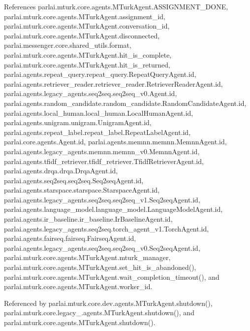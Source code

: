 References parlai.\+mturk.\+core.\+agents.\+M\+Turk\+Agent.\+A\+S\+S\+I\+G\+N\+M\+E\+N\+T\+\_\+\+D\+O\+NE, parlai.\+mturk.\+core.\+agents.\+M\+Turk\+Agent.\+assignment\+\_\+id, parlai.\+mturk.\+core.\+agents.\+M\+Turk\+Agent.\+conversation\+\_\+id, parlai.\+mturk.\+core.\+agents.\+M\+Turk\+Agent.\+disconnected, parlai.\+messenger.\+core.\+shared\+\_\+utils.\+format, parlai.\+mturk.\+core.\+agents.\+M\+Turk\+Agent.\+hit\+\_\+is\+\_\+complete, parlai.\+mturk.\+core.\+agents.\+M\+Turk\+Agent.\+hit\+\_\+is\+\_\+returned, parlai.\+agents.\+repeat\+\_\+query.\+repeat\+\_\+query.\+Repeat\+Query\+Agent.\+id, parlai.\+agents.\+retriever\+\_\+reader.\+retriever\+\_\+reader.\+Retriever\+Reader\+Agent.\+id, parlai.\+agents.\+legacy\+\_\+agents.\+seq2seq.\+seq2seq\+\_\+v0.\+Agent.\+id, parlai.\+agents.\+random\+\_\+candidate.\+random\+\_\+candidate.\+Random\+Candidate\+Agent.\+id, parlai.\+agents.\+local\+\_\+human.\+local\+\_\+human.\+Local\+Human\+Agent.\+id, parlai.\+agents.\+unigram.\+unigram.\+Unigram\+Agent.\+id, parlai.\+agents.\+repeat\+\_\+label.\+repeat\+\_\+label.\+Repeat\+Label\+Agent.\+id, parlai.\+core.\+agents.\+Agent.\+id, parlai.\+agents.\+memnn.\+memnn.\+Memnn\+Agent.\+id, parlai.\+agents.\+legacy\+\_\+agents.\+memnn.\+memnn\+\_\+v0.\+Memnn\+Agent.\+id, parlai.\+agents.\+tfidf\+\_\+retriever.\+tfidf\+\_\+retriever.\+Tfidf\+Retriever\+Agent.\+id, parlai.\+agents.\+drqa.\+drqa.\+Drqa\+Agent.\+id, parlai.\+agents.\+seq2seq.\+seq2seq.\+Seq2seq\+Agent.\+id, parlai.\+agents.\+starspace.\+starspace.\+Starspace\+Agent.\+id, parlai.\+agents.\+legacy\+\_\+agents.\+seq2seq.\+seq2seq\+\_\+v1.\+Seq2seq\+Agent.\+id, parlai.\+agents.\+language\+\_\+model.\+language\+\_\+model.\+Language\+Model\+Agent.\+id, parlai.\+agents.\+ir\+\_\+baseline.\+ir\+\_\+baseline.\+Ir\+Baseline\+Agent.\+id, parlai.\+agents.\+legacy\+\_\+agents.\+seq2seq.\+torch\+\_\+agent\+\_\+v1.\+Torch\+Agent.\+id, parlai.\+agents.\+fairseq.\+fairseq.\+Fairseq\+Agent.\+id, parlai.\+agents.\+legacy\+\_\+agents.\+seq2seq.\+seq2seq\+\_\+v0.\+Seq2seq\+Agent.\+id, parlai.\+mturk.\+core.\+agents.\+M\+Turk\+Agent.\+mturk\+\_\+manager, parlai.\+mturk.\+core.\+agents.\+M\+Turk\+Agent.\+set\+\_\+hit\+\_\+is\+\_\+abandoned(), parlai.\+mturk.\+core.\+agents.\+M\+Turk\+Agent.\+wait\+\_\+completion\+\_\+timeout(), and parlai.\+mturk.\+core.\+agents.\+M\+Turk\+Agent.\+worker\+\_\+id.



Referenced by parlai.\+mturk.\+core.\+dev.\+agents.\+M\+Turk\+Agent.\+shutdown(), parlai.\+mturk.\+core.\+legacy\+\_.\+agents.\+M\+Turk\+Agent.\+shutdown(), and parlai.\+mturk.\+core.\+agents.\+M\+Turk\+Agent.\+shutdown().

